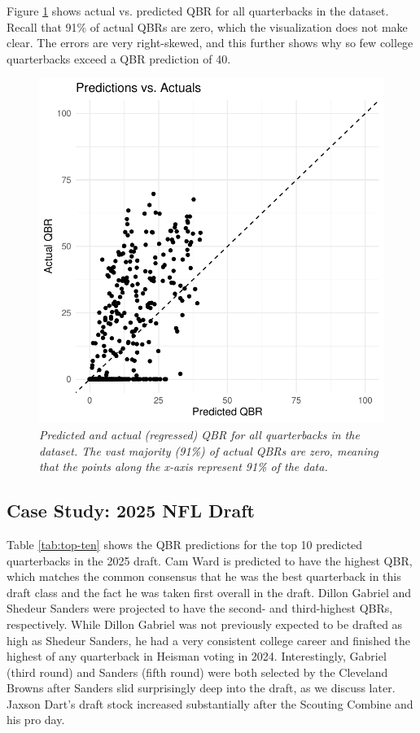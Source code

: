 \documentclass{article}
\begin{document}
Figure \ref{fig:predicted-vs-actuals} shows actual vs. predicted QBR for all quarterbacks in the dataset. Recall that 91\% of actual QBRs are zero, which the visualization does not make clear. The errors are very right-skewed, and this further shows why so few college quarterbacks exceed a QBR prediction of 40.

\begin{figure}[H]
  \centering
  \includegraphics[width=0.5\linewidth]{figures/predicted_vs_actuals.pdf}
  \caption{\it Predicted and actual (regressed) QBR for all quarterbacks in the dataset. The vast majority (91\%) of actual QBRs are zero, meaning that the points along the x-axis represent 91\% of the data.}
  \label{fig:predicted-vs-actuals}
\end{figure}

\subsection{Case Study: 2025 NFL Draft}

Table \ref{tab:top-ten} shows the QBR predictions for the top 10 predicted quarterbacks in the 2025 draft. Cam Ward is predicted to have the highest QBR, which matches the common consensus that he was the best quarterback in this draft class and the fact he was taken first overall in the draft. Dillon Gabriel and Shedeur Sanders were projected to have the second- and third-highest QBRs, respectively. While Dillon Gabriel was not previously expected to be drafted as high as Shedeur Sanders, he had a very consistent college career and finished the highest of any quarterback in Heisman voting in 2024. Interestingly, Gabriel (third round) and Sanders (fifth round) were both selected by the Cleveland Browns after Sanders slid surprisingly deep into the draft, as we discuss later. Jaxson Dart's draft stock increased substantially after the Scouting Combine and his pro day.
\end{document}
